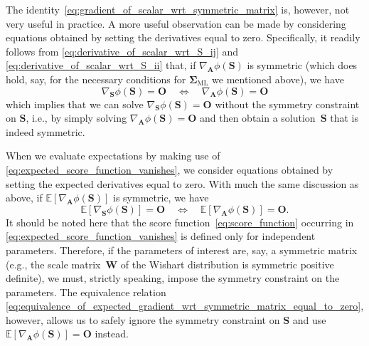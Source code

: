 \documentclass[12pt,a4paper]{article}
\begin{document}
The identity~\eqref{eq:gradient_of_scalar_wrt_symmetric_matrix} is, however, not very useful
in practice.
A more useful observation can be made by considering equations obtained by
setting the derivatives equal to zero.
Specifically, it readily follows from \eqref{eq:derivative_of_scalar_wrt_S_ij} and
\eqref{eq:derivative_of_scalar_wrt_S_ii} that,
if $\nabla_{\mathbf{A}} \phi(\mathbf{S})$ is symmetric
(which does hold, say,
for the necessary conditions for $\bm{\Sigma}_{\text{ML}}$ we mentioned above),
we have
\begin{equation}
\nabla_{\mathbf{S}} \phi(\mathbf{S}) = \mathbf{O}
\quad \Longleftrightarrow \quad
\nabla_{\mathbf{A}} \phi(\mathbf{S}) = \mathbf{O}
\end{equation}
which implies that we can solve $\nabla_{\mathbf{S}} \phi(\mathbf{S}) = \mathbf{O}$
without the symmetry constraint on $\mathbf{S}$, i.e.,
by simply solving $\nabla_{\mathbf{A}} \phi(\mathbf{S}) = \mathbf{O}$
and then obtain a solution~$\mathbf{S}$ that is indeed symmetric.

When we evaluate expectations by making use of \eqref{eq:expected_score_function_vanishes},
we consider equations obtained by setting the expected derivatives equal to zero.
With much the same discussion as above,
if $\mathbb{E}\left[\nabla_{\mathbf{A}} \phi(\mathbf{S})\right]$ is symmetric,
we have
\begin{equation}
\mathbb{E}\left[\nabla_{\mathbf{S}} \phi(\mathbf{S})\right] = \mathbf{O}
\quad \Longleftrightarrow \quad
\mathbb{E}\left[\nabla_{\mathbf{A}} \phi(\mathbf{S})\right] = \mathbf{O} .
\label{eq:equivalence_of_expected_gradient_wrt_symmetric_matrix_equal_to_zero}
\end{equation}
It should be noted here that the score function~\eqref{eq:score_function}
occurring in \eqref{eq:expected_score_function_vanishes}
is defined only for independent parameters.
Therefore, if the parameters of interest are, say, a symmetric matrix
(e.g., the scale matrix~$\mathbf{W}$ of the Wishart distribution is symmetric positive definite),
we must, strictly speaking, impose the symmetry constraint on the parameters.
The equivalence relation~%
\eqref{eq:equivalence_of_expected_gradient_wrt_symmetric_matrix_equal_to_zero}, however,
allows us to safely ignore the symmetry constraint on $\mathbf{S}$ and use
$\mathbb{E}\left[\nabla_{\mathbf{A}} \phi(\mathbf{S})\right] = \mathbf{O}$ instead.
\end{document}
